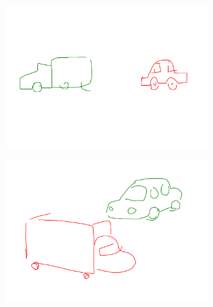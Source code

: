 \begin{figure}[ht]
        \begin{subfigure}{0.45\textwidth}
            \centering
            \includegraphics[width=\textwidth]{figures/truck_behind_car.pdf}
            \caption{\protect{}}
        \end{subfigure}
        \hfill
        \begin{subfigure}{0.45\textwidth}
            \centering
            \includegraphics[width=\textwidth]{figures/car_next_to_truck.pdf}
            \caption{\protect{}}
        \end{subfigure}
       

\end{figure}
